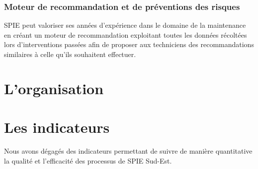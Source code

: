     \subsubsection{Moteur de recommandation et de préventions des risques}

        SPIE peut valoriser ses années d'expérience dans le domaine de la maintenance en créant un moteur de recommandation exploitant toutes les données récoltées lors d'interventions passées afin de proposer aux techniciens des recommandations similaires à celle qu'ils souhaitent effectuer.

\section{L'organisation}

\section{Les indicateurs}

    Nous avons dégagés des indicateurs permettant de suivre de manière quantitative la qualité et l'efficacité des processus de SPIE Sud-Est.

